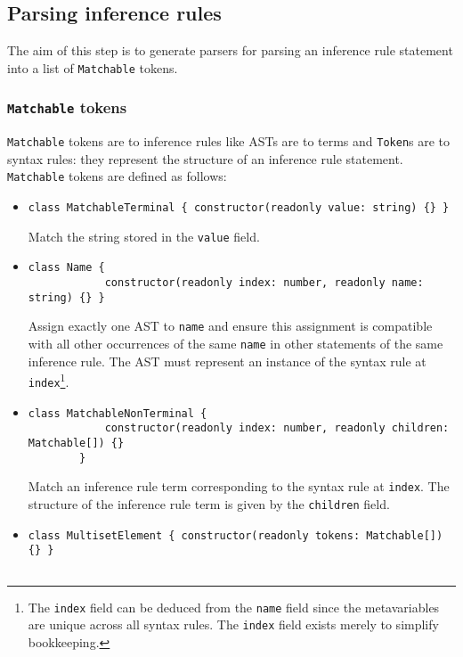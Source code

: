 \subsection{Parsing inference rules}
\label{inference:parsing}
The aim of this step is to generate parsers for parsing an inference rule statement into a list of \lstinline{Matchable} tokens.

\subsubsection{\texorpdfstring{\lstinline{Matchable}}{Matchable} tokens}
\lstinline{Matchable} tokens are to inference rules like ASTs are to terms and \lstinline{Token}s are to syntax rules: they represent the structure of an inference rule statement. \lstinline{Matchable} tokens are defined as follows:
\begin{itemize}
    \item \begin{lstlisting}[style=ds]
        class MatchableTerminal { constructor(readonly value: string) {} }
    \end{lstlisting}
    Match the string stored in the \lstinline{value} field.
    \item \begin{lstlisting}[style=ds]
        class Name {
            constructor(readonly index: number, readonly name: string) {} }
    \end{lstlisting}
    Assign exactly one AST to \lstinline{name} and ensure this assignment is compatible with all other occurrences of the same \lstinline{name} in other statements of the same inference rule. The AST must represent an instance of the syntax rule at \lstinline{index}\footnote{The \lstinline{index} field can be deduced from the \lstinline{name} field since the metavariables are unique across all syntax rules. The \lstinline{index} field exists merely to simplify bookkeeping.}.
    \item \begin{lstlisting}[style=ds]
        class MatchableNonTerminal {
            constructor(readonly index: number, readonly children: Matchable[]) {}
        }
    \end{lstlisting}
    Match an inference rule term corresponding to the syntax rule at \lstinline{index}. The structure of the inference rule term is given by the \lstinline{children} field.
    \item \begin{lstlisting}[style=ds]
        class MultisetElement { constructor(readonly tokens: Matchable[]) {} }


\end{lstlisting}
\end{itemize}
